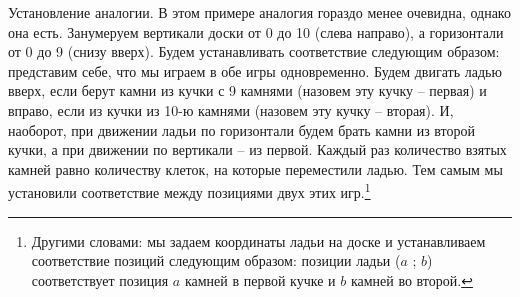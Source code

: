 Установление аналогии. В этом примере аналогия гораздо менее очевидна, однако она есть. Занумеруем вертикали доски от 0 до 10 (слева направо), а горизонтали от 0 до 9 (снизу вверх). Будем устанавливать соответствие следующим образом: представим себе, что мы играем в обе игры одновременно. Будем двигать ладью вверх, если берут камни из кучки с 9 камнями (назовем эту кучку -- первая) и вправо, если из кучки из 10-ю камнями (назовем эту кучку -- вторая). И, наоборот, при движении ладьи по горизонтали будем брать камни из второй кучки, а при движении по вертикали -- из первой. Каждый раз количество взятых камней равно количеству клеток, на которые переместили ладью. Тем самым мы установили соответствие между позициями двух этих игр.\footnote{ Другими словами: мы задаем координаты ладьи на доске и устанавливаем соответствие позиций следующим образом: позиции ладьи ($  a  $ ; $ b  $) соответствует позиция $  a  $ камней в первой кучке и $  b  $ камней во второй.} 

